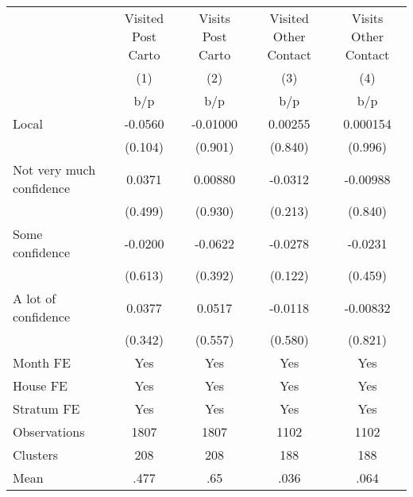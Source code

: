 {
\def\sym#1{\ifmmode^{#1}\else\(^{#1}\)\fi}
\begin{tabular}{l*{4}{c}}
\toprule
                &\multicolumn{1}{c}{Visited Post Carto}&\multicolumn{1}{c}{Visits Post Carto}&\multicolumn{1}{c}{Visited Other Contact}&\multicolumn{1}{c}{Visits Other Contact}\\
                &\multicolumn{1}{c}{(1)}&\multicolumn{1}{c}{(2)}&\multicolumn{1}{c}{(3)}&\multicolumn{1}{c}{(4)}\\
                &      b/p&      b/p&      b/p&      b/p\\
\midrule
Local           &  -0.0560& -0.01000&  0.00255& 0.000154\\
                &  (0.104)&  (0.901)&  (0.840)&  (0.996)\\
Not very much confidence&   0.0371&  0.00880&  -0.0312& -0.00988\\
                &  (0.499)&  (0.930)&  (0.213)&  (0.840)\\
Some confidence &  -0.0200&  -0.0622&  -0.0278&  -0.0231\\
                &  (0.613)&  (0.392)&  (0.122)&  (0.459)\\
A lot of confidence&   0.0377&   0.0517&  -0.0118& -0.00832\\
                &  (0.342)&  (0.557)&  (0.580)&  (0.821)\\
Month FE        &      Yes&      Yes&      Yes&      Yes\\
House FE        &      Yes&      Yes&      Yes&      Yes\\
Stratum FE      &      Yes&      Yes&      Yes&      Yes\\
\midrule
Observations    &     1807&     1807&     1102&     1102\\
Clusters        &      208&      208&      188&      188\\
Mean            &     .477&      .65&     .036&     .064\\
\bottomrule
\end{tabular}
}
